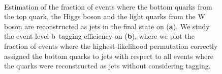 \begin{figure}
\begin{centering}
\\
\caption[Fraction of events with correct matching to the hard process]{Estimation of the fraction of events where the bottom quarks from the top quark, the Higgs boson and the light quarks from the W boson are reconstructed as jets in the final state on (\textbf{a}). We study the event-level b~tagging efficiency on (\textbf{b}), where we plot the fraction of events where the highest-likelihood permutation correctly assigned the bottom quarks to jets with respect to all events where the quarks were reconstructed as jets without considering tagging.}
\label{fig:blr_matching}
\end{centering}
\end{figure}
 
